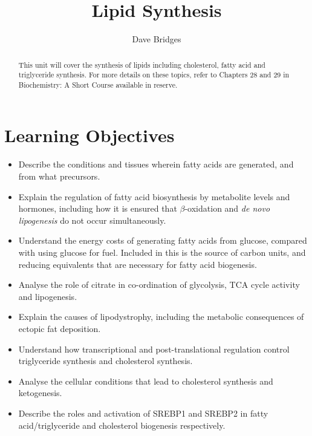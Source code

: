 \documentclass{tufte-handout}
\title{Lipid Synthesis}
\author{Dave Bridges}
\begin{document}
\maketitle%

\begin{abstract}
\noindent This unit will cover the synthesis of lipids including cholesterol, fatty acid and triglyceride synthesis.  For more details on these topics, refer to Chapters 28 and 29 in Biochemistry: A Short Course available in reserve\cite{Berg2015}.
\end{abstract}

\tableofcontents

\pagebreak{}
\section{Learning Objectives}

\begin{itemize}
\item Describe the conditions and tissues wherein fatty acids are generated, and from what precursors.
\item Explain the regulation of fatty acid biosynthesis by metabolite levels and hormones, including how it is ensured that $\beta$-oxidation and \textit{de novo lipogenesis} do not occur simultaneously.
\item Understand the energy costs of generating fatty acids from glucose, compared with using glucose for fuel.  Included in this is the source of carbon units, and reducing equivalents that are necessary for fatty acid biogenesis.
\item Analyse the role of citrate in co-ordination of glycolysis, TCA cycle activity and lipogenesis.
\item Explain the causes of lipodystrophy, including the metabolic consequences of ectopic fat deposition.
\item Understand how transcriptional and post-translational regulation control triglyceride synthesis and cholesterol synthesis.
\item Analyse the cellular conditions that lead to cholesterol synthesis and ketogenesis.
\item Describe the roles and activation of SREBP1 and SREBP2 in fatty acid/triglyceride and cholesterol biogenesis respectively.
\end{itemize}
\end{document}
